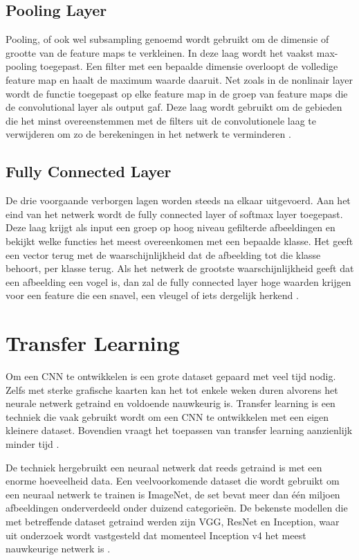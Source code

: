 \subsection{Pooling Layer}
\label{ssec:Pooling layer}
Pooling, of ook wel subsampling genoemd wordt gebruikt om de dimensie of grootte van de feature maps te verkleinen. In deze laag wordt het vaakst max-pooling toegepast. Een filter met een bepaalde dimensie overloopt de volledige feature map en haalt de maximum waarde daaruit. Net zoals in de nonlinair layer wordt de functie toegepast op elke feature map in de groep van feature maps die de convolutional layer als output gaf. Deze laag wordt gebruikt om de gebieden die het minst overeenstemmen met de filters uit de convolutionele laag te verwijderen om zo de berekeningen in het netwerk te verminderen \autocite{jeremy}.

\subsection{Fully Connected Layer}
\label{ssec:Fully Connected Layer}
De drie voorgaande verborgen lagen worden steeds na elkaar uitgevoerd. Aan het eind van het netwerk wordt de fully connected layer of softmax layer toegepast. Deze laag krijgt als input een groep op hoog niveau gefilterde afbeeldingen en bekijkt welke functies het meest overeenkomen met een bepaalde klasse. Het geeft een vector terug met de waarschijnlijkheid dat de afbeelding tot die klasse behoort, per klasse terug. Als het netwerk de grootste waarschijnlijkheid geeft dat een afbeelding een vogel is, dan zal de fully connected layer hoge waarden krijgen voor een feature die een snavel, een vleugel of iets dergelijk herkend \autocite{ujjwalkarn}.

\section{Transfer Learning}
\label{sec:Transfer Learning}

Om een CNN te ontwikkelen is een grote dataset gepaard met veel tijd nodig. Zelfs met sterke grafische kaarten kan het tot enkele weken duren alvorens het neurale netwerk getraind en voldoende nauwkeurig is. Transfer learning is een techniek die vaak gebruikt wordt om een CNN te ontwikkelen met een eigen kleinere dataset. Bovendien vraagt het toepassen van transfer learning aanzienlijk minder tijd \autocite{datacamp}.

De techniek hergebruikt een neuraal netwerk dat reeds getraind is met een enorme hoeveelheid data. Een veelvoorkomende dataset die wordt gebruikt om een neuraal netwerk te trainen is ImageNet, de set bevat meer dan één miljoen afbeeldingen onderverdeeld onder duizend categorieën. De bekenste modellen die met betreffende dataset getraind werden zijn VGG, ResNet en Inception, waar uit onderzoek wordt vastgesteld dat momenteel Inception v4 het meest nauwkeurige netwerk is \autocite{arxiv}.

